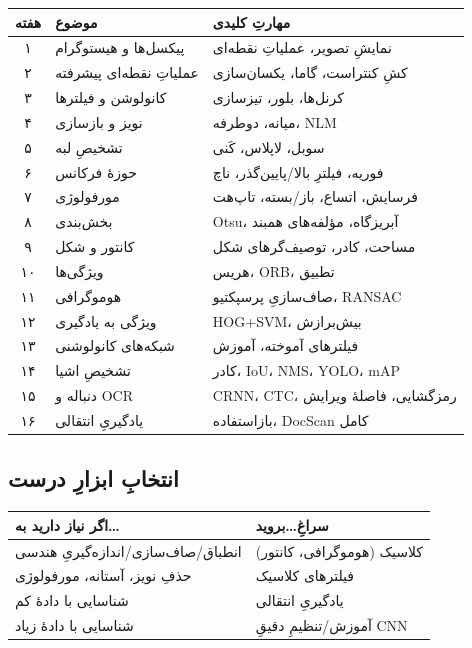 \documentclass[12pt,a4paper]{article}
\begin{document}
\begin{center}
\begin{tabular}{@{}cll@{}}
\hline
\textbf{هفته} & \textbf{موضوع} & \textbf{مهارتِ کلیدی} \\
\hline
۱ & پیکسل‌ها و هیستوگرام & نمایشِ تصویر، عملیاتِ نقطه‌ای \\
۲ & عملیاتِ نقطه‌ای پیشرفته & کشِ کنتراست، گاما، یکسان‌سازی \\
۳ & کانولوشن و فیلترها & کرنل‌ها، بلور، تیزسازی \\
۴ & نویز و بازسازی & میانه، دوطرفه، NLM \\
۵ & تشخیصِ لبه & سوبل، لاپلاس، کَنی \\
۶ & حوزهٔ فرکانس & فوریه، فیلترِ بالا/پایین‌گذر، ناچ \\
۷ & مورفولوژی & فرسایش، اتساع، باز/بسته، تاپ‌هت \\
۸ & بخش‌بندی & Otsu، آبریزگاه، مؤلفه‌های همبند \\
۹ & کانتور و شکل & مساحت، کادر، توصیف‌گرهای شکل \\
۱۰ & ویژگی‌ها & هریس، ORB، تطبیق \\
۱۱ & هوموگرافی & صاف‌سازیِ پرسپکتیو، RANSAC \\
۱۲ & ویژگی به یادگیری & HOG+SVM، بیش‌برازش \\
۱۳ & شبکه‌های کانولوشنی & فیلترهای آموخته، آموزش \\
۱۴ & تشخیصِ اشیا & کادر، IoU، NMS، YOLO، mAP \\
۱۵ & دنباله و OCR & CRNN، CTC، رمزگشایی، فاصلهٔ ویرایش \\
۱۶ & یادگیریِ انتقالی & بازاستفاده، DocScanِ کامل \\
\hline
\end{tabular}
\end{center}

\subsection{انتخابِ ابزارِ درست}

\begin{center}
\begin{tabular}{@{}ll@{}}
\hline
\textbf{اگر نیاز دارید به\ldots} & \textbf{سراغِ\ldots بروید} \\
\hline
انطباق/صاف‌سازی/اندازه‌گیریِ هندسی & کلاسیک (هوموگرافی، کانتور) \\
حذفِ نویز، آستانه، مورفولوژی & فیلترهای کلاسیک \\
شناسایی با دادهٔ کم & یادگیریِ انتقالی \\
شناسایی با دادهٔ زیاد & آموزش/تنظیمِ دقیقِ CNN \\
\hline
\end{tabular}
\end{center}
\end{document}
